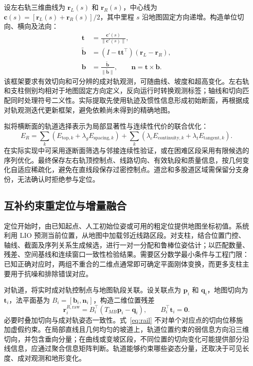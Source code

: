 \documentclass[UTF8,a4paper,12pt,fontset=fandol]{ctexart}
\newcommand{\vect}[1]{\bm{#1}}
\begin{document}
设左右轨三维曲线为 \(\vect{r}_L(s)\) 和 \(\vect{r}_R(s)\)，中心线为
\(\vect{c}(s)=[\vect{r}_L(s)+\vect{r}_R(s)]/2\)，其中里程 \(s\) 沿地图固定方向递增。构造单位切向、横向及法向：
\begin{equation}
\begin{aligned}
 \vect{t}&=\frac{\vect{c}'(s)}{\|\vect{c}'(s)\|},\\
 \widetilde{\vect{b}}&=(I-\vect{t}\vect{t}^{\top})
       (\vect{r}_L-\vect{r}_R),\\
 \vect{b}&=\frac{\widetilde{\vect{b}}}{\|\widetilde{\vect{b}}\|},
 \qquad \vect{n}=\vect{t}\times\vect{b}.
\end{aligned}
\end{equation}
该框架要求有效切向和可分辨的成对轨观测，可随曲线、坡度和超高变化。左右轨和支柱侧别均相对于地图固定方向定义，反向运行时转换观测标签；轴线和切向匹配同时处理符号二义性。实际提取先使用轨迹及惯性信息形成初始断面，再根据成对轨观测迭代更新框架，避免依赖尚未得到的精确地图。

拟将横断面的轨道选择表示为局部显著性与连续性代价的联合优化：
\begin{equation}
 E_R=\sum_k
 \left(E_{\mathrm{top},k}
 +\lambda_g E_{\mathrm{spacing},k}\right)
 +\sum_k\left(
 \lambda_c E_{\mathrm{continuity},k}
 +\lambda_t E_{\mathrm{tangent},k}\right).
\end{equation}
在实际实现中可采用逐断面筛选与邻接连续性验证，或在困难区段采用有限候选的序列优化。最终保存左右轨顶控制点、线路切向、有效轨段和质量信息，按几何变化自适应稀疏化，避免在直线段保存过密控制点。道岔和多股道区域需保留分支身份，无法确认时拒绝参与定位。

\subsection{互补约束重定位与增量融合}

定位开始时，由已知起点、人工初始位姿或可用的粗定位提供地图坐标初值。系统利用 LIO 预测当前位置，从地图中加载邻近线路区段。对支柱，结合位置门控、轴线、截面及序列关系生成候选，进行一对一分配和鲁棒位姿估计；以匹配数量、残差、空间基线和连续窗口一致性检验结果。需要区分数学最小条件与工程门限：已知正确对应时，两组不重合的二维点通常即可确定平面刚体变换，而更多支柱主要用于抗噪和排除错误对应。

对轨道，将实时成对轨控制点与地图轨段关联。设关联点为 \(\vect{p}_i\) 和 \(\vect{q}_i\)，地图切向为 \(\vect{t}_i\)，法平面基为 \(B_i=[\vect{b}_i,\vect{n}_i]\)，构造二维位置残差
\begin{equation}
 \vect{r}_i^{R,\mathrm{raw}}=B_i^\top(T_{MB}\vect{p}_i-\vect{q}_i),
 \qquad B_i^\top\vect{t}_i=\vect{0}.
 \label{eq:rail}
\end{equation}
必要时叠加切向与成对轨姿态一致性。式~\eqref{eq:rail} 不对单个对应点的切向位移施加虚假约束。在局部直线且几何均匀的坡道上，轨道位置约束的弱信息方向沿三维切向，并包含垂向分量；在曲线或变坡区段，不同位置的切向变化可能提供部分沿线信息，应通过聚合信息矩阵判断。轨道能够约束哪些姿态分量，还取决于可见长度、成对观测和地形变化。
\end{document}
